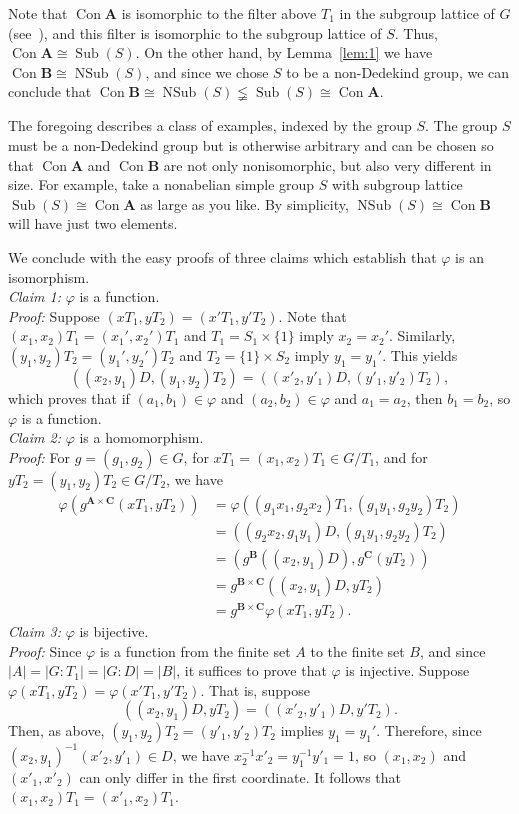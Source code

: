 \documentclass{au}
\theoremstyle{plain}
\newcommand{\<}{\ensuremath{\langle}}
\renewcommand{\>}{\ensuremath{\rangle}}
\renewcommand{\phi}{\ensuremath{\varphi}}
\newcommand{\bA}{\ensuremath{\mathbf{A}}}
\newcommand{\bB}{\ensuremath{\mathbf{B}}}
\newcommand{\bC}{\ensuremath{\mathbf{C}}}
\renewcommand{\lneq}{\ensuremath{\lneqq}}
\newcommand{\Con}{\ensuremath{\operatorname{Con}}}
\newcommand{\Sub}{\ensuremath{\operatorname{Sub}}}
\newcommand{\NSub}{\ensuremath{\operatorname{NSub}}}
\renewcommand{\phi}{\ensuremath{\varphi}}
\begin{document}
Note that $\Con \bA$ is isomorphic to
the filter above $T_1$ in the subgroup lattice of $G$ 
(see~\cite[Lemma 4.20]{alvi:1987}), and this filter is isomorphic to %
the subgroup lattice of $S$. 
Thus, $\Con \bA\cong \Sub(S)$.
On the other hand, by
Lemma~\ref{lem:1} we have $\Con \bB \cong \NSub(S)$, and since we chose $S$ to
be a non-Dedekind group, we can conclude that 
$\Con \bB \cong\NSub(S) \lneq\Sub(S) \cong  \Con \bA$. 

The foregoing describes a class of examples, indexed by the group $S$.  The
group $S$ must be a non-Dedekind group but is otherwise arbitrary and can be
chosen so that $\Con\bA$ and $\Con\bB$ are not only nonisomorphic, but also 
very different in size. For example, take a nonabelian
simple group $S$ with subgroup lattice $\Sub(S)\cong \Con\bA$ as large as you
like. By simplicity, $\NSub(S)\cong \Con \bB$ will have just two elements.

We conclude with the easy proofs of three claims which establish that $\phi$ is
an isomorphism. 
\\[4pt]
{\it Claim 1:} $\phi$ is a function.\\[2pt]
{\it Proof:} Suppose $(xT_1, yT_2) = (x'T_1, y'T_2)$.  Note that 
$(x_1,x_2)T_1 = (x_1',x_2')T_1$ and $T_1 = S_1\times \{1\}$ imply $x_2 =
x_2'$.  Similarly, 
$(y_1,y_2)T_2 = (y_1',y_2')T_2$ and $T_2 = \{1\}\times S_2$ imply $y_1 =
y_1'$. 
This yields
\[
((x_2,y_1)D, (y_1,y_2)T_2)
= ((x'_2,y'_1)D, (y'_1,y'_2)T_2),
\]
which proves that if $(a_1,b_1)\in \phi$ and
$(a_2,b_2) \in \phi$ and $a_1 = a_2$, then $b_1 = b_2$, so $\phi$ is a function.\\[4pt]
{\it Claim 2:} $\phi$ is a homomorphism.\\[2pt]
{\it Proof:} For
$g = (g_1, g_2) \in G$, for
$xT_1 = (x_1, x_2)T_1 \in G/T_1$, and for
$yT_2 = (y_1, y_2)T_2 \in G/T_2$, we have
\begin{align*}
\phi(g^{\bA\times \bC}(xT_1, yT_2)) 
&= \phi((g_1x_1,g_2x_2)T_1, (g_1y_1,g_2y_2)T_2) \\
&= ((g_2x_2,g_1y_1)D, (g_1y_1,g_2y_2)T_2) \\
&= (g^{\bB}((x_2,y_1)D), g^{\bC}(yT_2)) \\
&= g^{\bB\times \bC}((x_2,y_1)D, yT_2) \\
&= g^{\bB\times \bC}\phi(xT_1, yT_2).
\end{align*}
{\it Claim 3:} $\phi$ is bijective.\\[2pt]
{\it Proof:} 
Since $\phi$ is a function from the finite set $A$ to the finite set $B$, and
since $|A|= |G:T_1| = |G:D| = |B|$, it suffices to prove that $\phi$ is
injective.  Suppose $\phi(xT_1, yT_2) = \phi(x'T_1, y'T_2)$.
That is,  suppose
\[
((x_2,y_1)D, yT_2) = 
((x'_2,y'_1)D, y'T_2).
\]
Then, as above,
$(y_1,y_2)T_2 = (y'_1,y'_2)T_2$ implies $y_1 = y_1'$.  Therefore,
 since $(x_2,y_1)^{-1}(x'_2,y'_1) \in D$, we have
$x_2^{-1}x'_2 = y_1^{-1}y'_1 = 1$,  
so 
$(x_1,x_2)$ and $(x'_1,x'_2)$ can 
only differ in the first coordinate.  It follows that
$(x_1,x_2)T_1 = (x'_1,x_2)T_1$.
\end{document}
